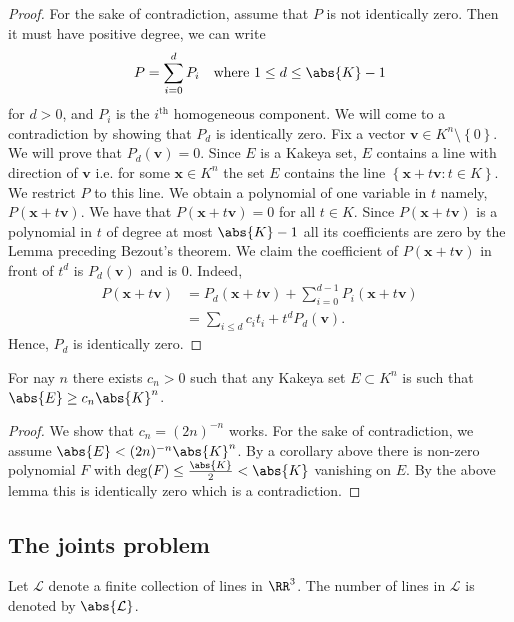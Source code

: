 \documentclass[12pt, a4paper]{article}
\begin{document}
\begin{proof}
    For the sake of contradiction, assume that \(P\) is not identically zero. Then it must have positive degree, we can write 
    \[P = \sum_{i=0}^{d} P_i \quad \text{where } 1\leq d \leq \abs{K}-1\]
    for \(d>0\), and \(P_i\) is the \(i^\text{th}\) homogeneous component. We will come to a contradiction by showing that \(P_d\) is identically zero. Fix a vector \(\bm{v} \in K^n \setminus \left\{ 0 \right\}\). We will prove that \(P_d(\bm{v})=0\). Since \(E\) is a Kakeya set, \(E\) contains a line with direction of \(\bm{v}\) i.e. for some \(\bm{x} \in K^n\) the set \(E\) contains the line \(\left\{ \bm{x}+t\bm{v} : t\in K \right\}\). We restrict \(P\) to this line. We obtain a polynomial of one variable in \(t\) namely, \(P(\bm{x}+t\bm{v})\). We have that \(P(\bm{x}+t\bm{v})=0\) for all \(t\in K\). Since \(P(\bm{x}+t\bm{v})\) is a polynomial in \(t\) of degree at most \(\abs{K}-1\) all its coefficients are zero by the Lemma preceding Bezout's theorem. We claim the coefficient of \(P(\bm{x}+t\bm{v})\) in front of \(t^d\) is \(P_d(\bm{v})\) and is \(0\). Indeed,
    \[\begin{aligned}
        P(\bm{x}+t\bm{v}) &= P_d(\bm{x}+t\bm{v})+\sum_{i=0}^{d-1}P_i(\bm{x}+t\bm{v})  \\
        &= \sum_{i\leq d} c_i t_i +t^d P_d(\bm{v}).
    \end{aligned}\]
    Hence, \(P_d\) is identically zero.
\end{proof}

\begin{mdprop}
    For nay \(n\) there exists \(c_n>0\) such that any Kakeya set \(E \subset K^n\) is such that \(\abs{E}\geq c_n \abs{K}^n\).
\end{mdprop}

\begin{proof}
    We show that \(c_n = (2n)^{-n}\) works. For the sake of contradiction, we assume \(\abs{E} <(2n)^{-n}\abs{K}^n\). By a corollary above there is non-zero polynomial \(F\) with \(\deg(F) \leq \frac{\abs{K}}{2} <\abs{K}\) vanishing on \(E\). By the above lemma this is identically zero which is a contradiction.
\end{proof}

\subsection{The joints problem}

\begin{definition}
    Let \(\mathcal{L}\) denote a finite collection of lines in \(\RR^3\). The number of lines in \(\mathcal{L}\) is denoted by \(\abs{\mathcal{L}}\).
\end{definition}
\end{document}
